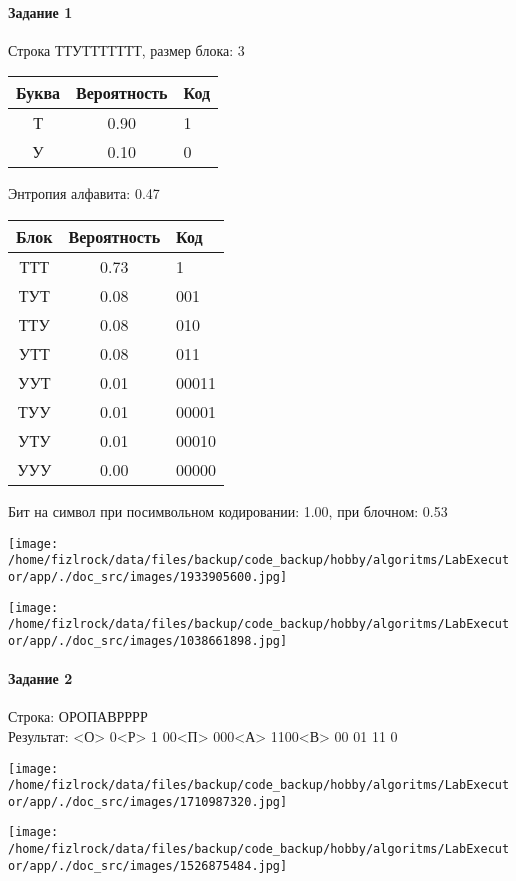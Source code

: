 \documentclass[a4paper, 12pt]{article}
\begin{document}
\paragraph{Задание 1}

Строка ТТУТТТТТТТ, размер блока: 3
\begin{center}
 \begin{tabular}{ |c|c|l| } 
  \hline
     Буква & Вероятность & Код\\ \hline
Т & 0.90 & 1\\\hline
У & 0.10 & 0
\\ \hline \end{tabular}
\end{center}
Энтропия алфавита: 0.47
\begin{center}
 \begin{tabular}{ |c|c|l| } 
  \hline
     Блок & Вероятность & Код\\ \hline
ТТТ & 0.73 & 1\\\hline
ТУТ & 0.08 & 001\\\hline
ТТУ & 0.08 & 010\\\hline
УТТ & 0.08 & 011\\\hline
УУТ & 0.01 & 00011\\\hline
ТУУ & 0.01 & 00001\\\hline
УТУ & 0.01 & 00010\\\hline
УУУ & 0.00 & 00000
\\ \hline \end{tabular}
\end{center}
Бит на символ при посимвольном кодировании: 1.00, при блочном: 0.53

\texttt{[image: /home/fizlrock/data/files/backup/code\_backup/hobby/algoritms/LabExecutor/app/./doc\_src/images/1933905600.jpg]}

\texttt{[image: /home/fizlrock/data/files/backup/code\_backup/hobby/algoritms/LabExecutor/app/./doc\_src/images/1038661898.jpg]}
\pagebreak
\paragraph{Задание 2}

Строка: 
ОРОПАВРРРР\\
Результат: <О> 0<Р> 1 00<П> 000<А> 1100<В> 00 01 11 0

\texttt{[image: /home/fizlrock/data/files/backup/code\_backup/hobby/algoritms/LabExecutor/app/./doc\_src/images/1710987320.jpg]}

\texttt{[image: /home/fizlrock/data/files/backup/code\_backup/hobby/algoritms/LabExecutor/app/./doc\_src/images/1526875484.jpg]}
\end{document}
